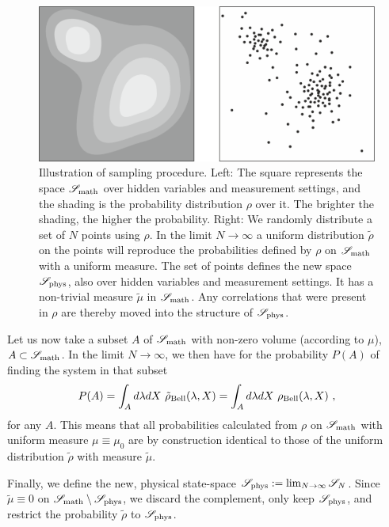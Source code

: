 \documentclass{article}
\begin{document}
\begin{figure}[ht]
\centering
\includegraphics[width=\textwidth]{smath.png}
\caption{Illustration of sampling procedure. Left: The square represents the space ${\mathscr S}_{\rm math}$ over hidden variables and measurement settings, and the shading is the probability distribution $\rho$ over it. The brighter the shading, the higher the probability. Right: We randomly distribute a set of $N$ points using $\rho$. In the limit $N \to \infty$ a uniform distribution $\tilde \rho$ on the points will reproduce the probabilities defined by $\rho$ on ${\mathscr S}_{\rm math}$ with a uniform measure. The set of points defines the new space ${\mathscr S}_{\rm phys}$, also over hidden variables and measurement settings. It has a non-trivial measure $\tilde \mu$ in ${\mathscr S}_{\rm math}$. Any correlations that were present in $\rho$ are thereby moved into the structure of ${\mathscr S}_{\rm phys}$. \protect{\label{fig}}}
\end{figure}

Let us now take a subset $A$ of ${\mathscr S}_{\rm math}$ with non-zero volume (according to $\mu$), $A \subset {\mathscr S}_{\rm math}$. In the limit $N\to \infty$, we then have for the probability $P(A)$ of finding the system in that subset
\begin{eqnarray}
P(A) = \int_{A} d\lambda dX ~ \tilde \rho_{\rm Bell}(\lambda, X)   = \int_A d \lambda dX ~ \rho_{\rm Bell}(\lambda, X)~,
\end{eqnarray}
for any $A$.
This means that all probabilities calculated from $\rho$ on ${\mathscr S}_{\rm math}$ with uniform measure $\mu \equiv \mu_0$ are by construction identical to those of the uniform distribution $\tilde \rho$ with measure $\tilde \mu$. 

Finally, we define the new, physical state-space ${\mathscr S}_{\rm phys}:= \lim_{N\to \infty} {\mathscr S}_N$. Since $\tilde \mu \equiv 0$ on ${\mathscr S}_{\rm math} \setminus {\mathscr S}_{\rm phys}$, we discard the complement, only keep ${\mathscr S}_{\rm phys}$, and restrict the probability $\tilde \rho$ to ${\mathscr S}_{\rm phys}$.
\end{document}
